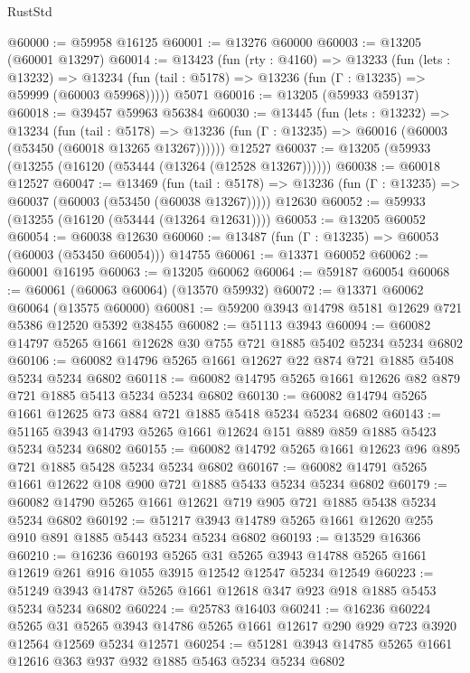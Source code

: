 \begin{lexlean}{RustStd}
\begin{coremodule}
@60000 := @59958 @16125
@60001 := @13276 @60000
@60003 := @13205 (@60001 @13297)
@60014 := @13423
    (fun (rty : @4160) =>
    @13233
      (fun (lets : @13232) =>
      @13234 (fun (tail : @5178) => @13236 (fun (Γ : @13235) => @59999 (@60003 @59968)))))
    @5071
@60016 := @13205 (@59933 @59137)
@60018 := @39457 @59963 @56384
@60030 := @13445
    (fun (lets : @13232) =>
    @13234
      (fun (tail : @5178) =>
      @13236 (fun (Γ : @13235) => @60016 (@60003 (@53450 (@60018 @13265 @13267))))))
    @12527
@60037 := @13205 (@59933 (@13255 (@16120 (@53444 (@13264 (@12528 @13267))))))
@60038 := @60018 @12527
@60047 := @13469
    (fun (tail : @5178) => @13236 (fun (Γ : @13235) => @60037 (@60003 (@53450 (@60038 @13267)))))
    @12630
@60052 := @59933 (@13255 (@16120 (@53444 (@13264 @12631))))
@60053 := @13205 @60052
@60054 := @60038 @12630
@60060 := @13487 (fun (Γ : @13235) => @60053 (@60003 (@53450 @60054))) @14755
@60061 := @13371 @60052
@60062 := @60001 @16195
@60063 := @13205 @60062
@60064 := @59187 @60054
@60068 := @60061 (@60063 @60064) (@13570 @59932)
@60072 := @13371 @60062 @60064 (@13575 @60000)
@60081 := @59200 @3943 @14798 @5181 @12629 @721 @5386 @12520 @5392 @38455
@60082 := @51113 @3943
@60094 := @60082 @14797 @5265 @1661 @12628 @30 @755 @721 @1885 @5402 @5234 @5234 @6802
@60106 := @60082 @14796 @5265 @1661 @12627 @22 @874 @721 @1885 @5408 @5234 @5234 @6802
@60118 := @60082 @14795 @5265 @1661 @12626 @82 @879 @721 @1885 @5413 @5234 @5234 @6802
@60130 := @60082 @14794 @5265 @1661 @12625 @73 @884 @721 @1885 @5418 @5234 @5234 @6802
@60143 := @51165 @3943 @14793 @5265 @1661 @12624 @151 @889 @859 @1885 @5423 @5234 @5234 @6802
@60155 := @60082 @14792 @5265 @1661 @12623 @96 @895 @721 @1885 @5428 @5234 @5234 @6802
@60167 := @60082 @14791 @5265 @1661 @12622 @108 @900 @721 @1885 @5433 @5234 @5234 @6802
@60179 := @60082 @14790 @5265 @1661 @12621 @719 @905 @721 @1885 @5438 @5234 @5234 @6802
@60192 := @51217 @3943 @14789 @5265 @1661 @12620 @255 @910 @891 @1885 @5443 @5234 @5234 @6802
@60193 := @13529 @16366
@60210 := @16236
    @60193
    @5265
    @31
    @5265
    @3943
    @14788
    @5265
    @1661
    @12619
    @261
    @916
    @1055
    @3915
    @12542
    @12547
    @5234
    @12549
@60223 := @51249 @3943 @14787 @5265 @1661 @12618 @347 @923 @918 @1885 @5453 @5234 @5234 @6802
@60224 := @25783 @16403
@60241 := @16236
    @60224
    @5265
    @31
    @5265
    @3943
    @14786
    @5265
    @1661
    @12617
    @290
    @929
    @723
    @3920
    @12564
    @12569
    @5234
    @12571
@60254 := @51281 @3943 @14785 @5265 @1661 @12616 @363 @937 @932 @1885 @5463 @5234 @5234 @6802

\end{coremodule}
\end{lexlean}
